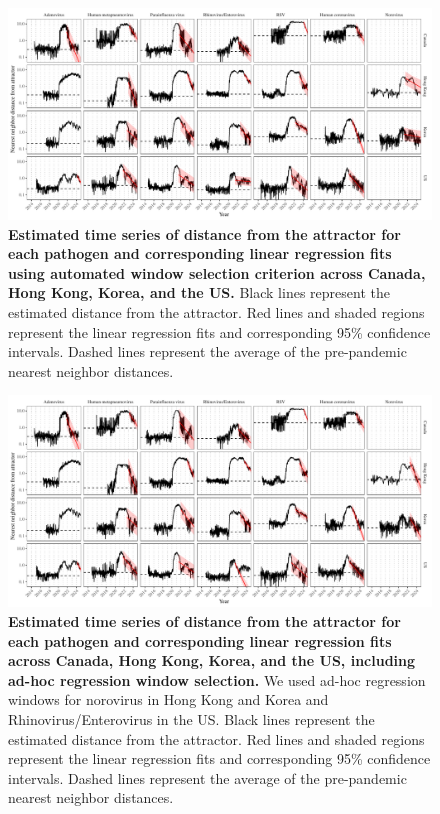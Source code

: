 \documentclass[12pt]{article}
\begin{document}
\begin{figure}[!th]
\includegraphics[width=\textwidth]{../figure4/figure4_dist_auto.pdf}
\caption{
\textbf{Estimated time series of distance from the attractor for each pathogen and corresponding linear regression fits using automated window selection criterion across Canada, Hong Kong, Korea, and the US.}
Black lines represent the estimated distance from the attractor.
Red lines and shaded regions represent the linear regression fits and corresponding 95\% confidence intervals.
Dashed lines represent the average of the pre-pandemic nearest neighbor distances.
}
\end{figure}

\pagebreak

\begin{figure}[!th]
\includegraphics[width=\textwidth]{../figure4/figure4_dist.pdf}
\caption{
\textbf{Estimated time series of distance from the attractor for each pathogen and corresponding linear regression fits across Canada, Hong Kong, Korea, and the US, including ad-hoc regression window selection.}
We used ad-hoc regression windows for norovirus in Hong Kong and Korea and Rhinovirus/Enterovirus in the US.
Black lines represent the estimated distance from the attractor.
Red lines and shaded regions represent the linear regression fits and corresponding 95\% confidence intervals.
Dashed lines represent the average of the pre-pandemic nearest neighbor distances.
}
\end{figure}
\end{document}
